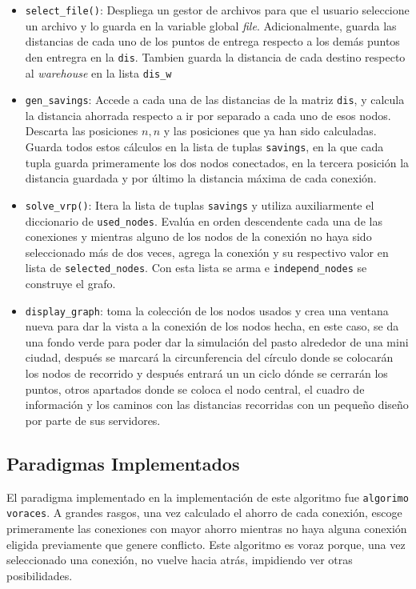 \documentclass[10pt,twocolumn,letterpaper]{article}
\begin{document}
\begin{itemize}
	\item \texttt{select\_file()}: Despliega un gestor de archivos para que el usuario seleccione un archivo y lo guarda en la variable global \textit{file}. Adicionalmente, guarda las distancias de cada uno de los puntos de entrega respecto a los demás puntos den entregra en la \texttt{dis}. Tambien guarda la distancia de cada destino respecto al \textit{warehouse} en la lista \texttt{dis\_w}
	\item \texttt{gen\_savings}: Accede a cada una de las distancias de la matriz \texttt{dis}, y calcula la distancia ahorrada respecto a ir por separado a cada uno de esos nodos. Descarta las posiciones $n, n$ y las posiciones que ya han sido calculadas. Guarda todos estos cálculos en la lista de tuplas \texttt{savings}, en la que cada tupla guarda primeramente los dos nodos conectados, en la tercera posición la distancia guardada y por último la distancia máxima de cada conexión.
	\item \texttt{solve\_vrp()}: Itera la lista de tuplas \texttt{savings} y utiliza auxiliarmente el diccionario de \texttt{used\_nodes}. Evalúa en orden descendente cada una de las conexiones y mientras alguno de los nodos de la conexión no haya sido seleccionado más de dos veces, agrega la conexión y su respectivo valor en lista de \texttt{selected\_nodes}. Con esta lista se arma e \texttt{independ\_nodes} se construye el grafo.
	\item \texttt{display\_graph}: toma la colección de los nodos usados  y crea una ventana nueva para dar la vista a la conexión de los nodos hecha, en este caso, se da una fondo verde para poder dar la simulación del pasto alrededor de una mini ciudad, después se marcará la circunferencia del círculo donde se colocarán los nodos de recorrido y después entrará un un ciclo dónde se cerrarán los puntos, otros apartados donde se coloca el nodo central, el cuadro de información y los caminos con las distancias recorridas con un pequeño diseño por parte de sus servidores.
\end{itemize}

\subsection{Paradigmas Implementados}

El paradigma implementado en la implementación de este algoritmo fue \texttt{algorimo voraces}. A grandes rasgos, una vez calculado el ahorro de cada conexión, escoge primeramente las conexiones con mayor ahorro mientras no haya alguna conexión eligida previamente que genere conflicto. Este algoritmo es voraz porque, una vez seleccionado una conexión, no vuelve hacia atrás, impidiendo ver otras posibilidades.
\end{document}
